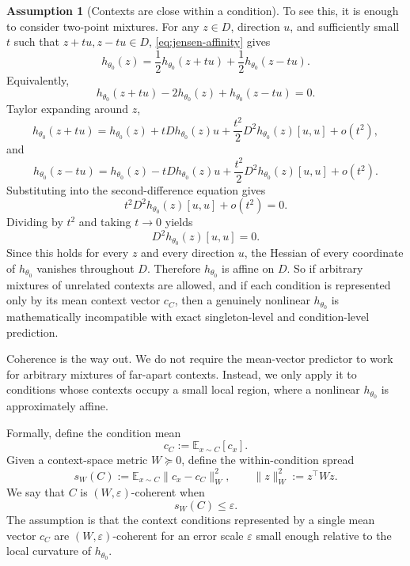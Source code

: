 \documentclass[11pt]{article}
\theoremstyle{definition}
\theoremstyle{definition}
\theoremstyle{assumptionstyle}
\newtheorem{assumption}{Assumption}[section]
\newcounter{prediction}
\newcommand{\E}{\mathbb{E}}            %
\begin{document}
\begin{assumption}[Contexts are close within a condition]
To see this, it is enough to consider two-point mixtures. For any \(z\in D\),
direction \(u\), and sufficiently small \(t\) such that
\(z+tu,z-tu\in D\), \eqref{eq:jensen-affinity} gives
\[
h_{\theta_0}(z)
=
\frac12 h_{\theta_0}(z+tu)
+
\frac12 h_{\theta_0}(z-tu).
\]
Equivalently,
\[
h_{\theta_0}(z+tu)-2h_{\theta_0}(z)+h_{\theta_0}(z-tu)=0.
\]
Taylor expanding around \(z\),
\[
h_{\theta_0}(z+tu)
=
h_{\theta_0}(z)
+
tDh_{\theta_0}(z)u
+
\frac{t^2}{2}D^2h_{\theta_0}(z)[u,u]
+
o(t^2),
\]
and
\[
h_{\theta_0}(z-tu)
=
h_{\theta_0}(z)
-
tDh_{\theta_0}(z)u
+
\frac{t^2}{2}D^2h_{\theta_0}(z)[u,u]
+
o(t^2).
\]
Substituting into the second-difference equation gives
\[
t^2D^2h_{\theta_0}(z)[u,u]+o(t^2)=0.
\]
Dividing by \(t^2\) and taking \(t\to0\) yields
\[
D^2h_{\theta_0}(z)[u,u]=0.
\]
Since this holds for every \(z\) and every direction \(u\), the Hessian of every
coordinate of \(h_{\theta_0}\) vanishes throughout \(D\). Therefore
\(h_{\theta_0}\) is affine on \(D\). So if arbitrary mixtures of unrelated
contexts are allowed, and if each condition is represented only by its mean
context vector \(c_C\), then a genuinely nonlinear \(h_{\theta_0}\) is
mathematically incompatible with exact singleton-level and condition-level
prediction.

Coherence is the way out. We do not require the mean-vector predictor to work for
arbitrary mixtures of far-apart contexts. Instead, we only apply it to conditions
whose contexts occupy a small local region, where a nonlinear
\(h_{\theta_0}\) is approximately affine.

Formally, define the condition mean
\[
c_C:=\E_{x\sim C}[c_x].
\]
Given a context-space metric \(W\succeq0\), define the within-condition spread
\[
s_W(C)
:=
\E_{x\sim C}\|c_x-c_C\|_W^2,
\qquad
\|z\|_W^2:=z^\top Wz.
\]
We say that \(C\) is \((W,\varepsilon)\)-coherent when
\[
s_W(C)\le \varepsilon.
\]
The assumption is that the context conditions represented by a single mean vector
\(c_C\) are \((W,\varepsilon)\)-coherent for an error scale \(\varepsilon\) small
enough relative to the local curvature of \(h_{\theta_0}\).


\end{assumption}
\end{document}
